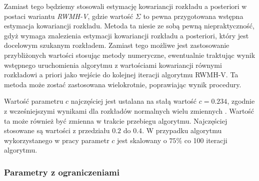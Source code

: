 Zamiast tego będziemy stosowali estymację kowariancji rozkładu a posteriori w postaci wariantu \emph{RWMH-V}, gdzie wartość $\Sigma$ to pewna przygotowana wstępna estymacja kowariancji rozkładu. Metoda ta niesie ze sobą pewną niepraktyczność, gdyż wymaga znalezienia estymacji kowariancji rozkładu a posteriori, który jest docelowym szukanym rozkładem. Zamiast tego możliwe jest zastosowanie przybliżonych wartości stosując metody numeryczne, ewentualnie traktując wynik wstępnego uruchomienia algorytmu z wartościami kowariancji równymi rozkładowi a priori jako wejście do kolejnej iteracji algorytmu RWMH-V. Ta metoda może zostać zastosowana wielokrotnie, poprawiając wynik procedury.

Wartość parametru $c$ najczęściej jest ustalana na stałą wartość $c = 0.234$, zgodnie z wcześniejszymi wynikami dla rozkładów normalnych wielu zmiennych \cite{herbst}. Wartość ta może również być zmienna w trakcie przebiegu algorytmu. Najczęściej stosowane są wartości z przedziału $0.2$ do $0.4$. W przypadku algorytmu wykorzystanego w pracy parametr $c$ jest skalowany o $75\%$ co 100 iteracji algorytmu. 

\subsubsection{Parametry z ograniczeniami}

